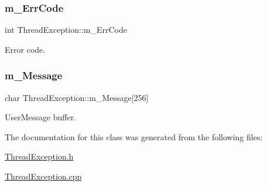 \subsubsection{\texorpdfstring{m\+\_\+\+Err\+Code}{m\_ErrCode}}
{\footnotesize\ttfamily int Thread\+Exception\+::m\+\_\+\+Err\+Code\hspace{0.3cm}{\ttfamily [protected]}}



Error code. 

\mbox{\label{classThreadException_aa2ab3078b7211738d8eeb1e9e4e2a8cb}} 
\subsubsection{\texorpdfstring{m\+\_\+\+Message}{m\_Message}}
{\footnotesize\ttfamily char Thread\+Exception\+::m\+\_\+\+Message\mbox{[}256\mbox{]}\hspace{0.3cm}{\ttfamily [protected]}}



User\+Message buffer. 



The documentation for this class was generated from the following files\+:\begin{DoxyCompactItemize}
\item 
\hyperlink{ThreadException_8h}{Thread\+Exception.\+h}\item 
\hyperlink{ThreadException_8cpp}{Thread\+Exception.\+cpp}\end{DoxyCompactItemize}
